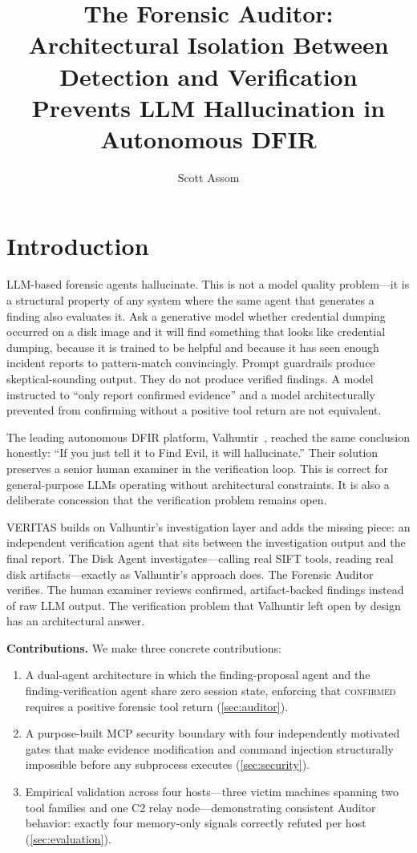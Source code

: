 \documentclass[sigconf, nonacm]{acmart}
\title{The Forensic Auditor: Architectural Isolation Between Detection and
       Verification Prevents LLM Hallucination in Autonomous DFIR}
\author{Scott Assom}
\affiliation{\institution{SANS FIND EVIL! Hackathon 2026}}
\begin{document}
\maketitle

\section{Introduction}

LLM-based forensic agents hallucinate. This is not a model quality problem---it
is a structural property of any system where the same agent that generates a
finding also evaluates it. Ask a generative model whether credential dumping
occurred on a disk image and it will find something that looks like credential
dumping, because it is trained to be helpful and because it has seen enough
incident reports to pattern-match convincingly. Prompt guardrails produce
skeptical-sounding output. They do not produce verified findings. A model
instructed to ``only report confirmed evidence'' and a model architecturally
prevented from confirming without a positive tool return are not equivalent.

The leading autonomous DFIR platform, Valhuntir~\cite{valhuntir}, reached the
same conclusion honestly: ``If you just tell it to Find Evil, it will
hallucinate.'' Their solution preserves a senior human examiner in the
verification loop. This is correct for general-purpose LLMs operating without
architectural constraints. It is also a deliberate concession that the
verification problem remains open.

VERITAS builds on Valhuntir's investigation layer and adds the missing piece: an
independent verification agent that sits between the investigation output and the
final report. The Disk Agent investigates---calling real SIFT tools, reading
real disk artifacts---exactly as Valhuntir's approach does. The Forensic Auditor
verifies. The human examiner reviews confirmed, artifact-backed findings instead
of raw LLM output. The verification problem that Valhuntir left open by design
has an architectural answer.

\textbf{Contributions.} We make three concrete contributions:
\begin{enumerate}
\item A dual-agent architecture in which the finding-proposal agent and the
finding-verification agent share zero session state, enforcing that
\textsc{confirmed} requires a positive forensic tool return
(\cref{sec:auditor}).
\item A purpose-built MCP security boundary with four independently motivated
gates that make evidence modification and command injection structurally
impossible before any subprocess executes (\cref{sec:security}).
\item Empirical validation across four hosts---three victim machines spanning
two tool families and one C2 relay node---demonstrating consistent Auditor
behavior: exactly four memory-only signals correctly refuted per host
(\cref{sec:evaluation}).
\end{enumerate}
\end{document}
